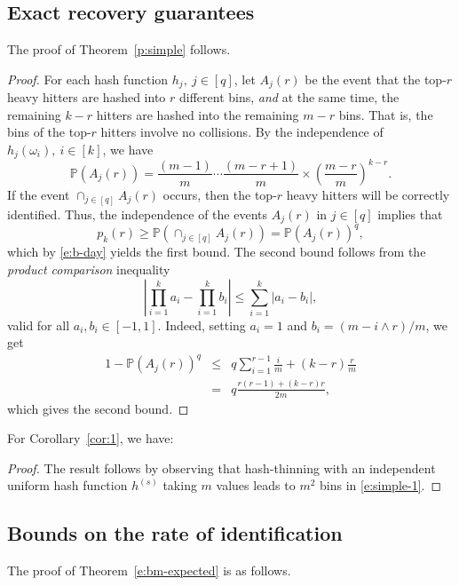 \documentclass[10pt, conference, letterpaper,onecolumn]{IEEEtranv1.8}
\renewcommand\P{\mathbb P}
\theoremstyle{plain}\newtheorem{thm}{Theorem}\newtheorem{lem}{Lemma}
\theoremstyle{definition}
\begin{document}
\subsection{Exact recovery guarantees}


The proof of Theorem~\ref{p:simple} follows.

\begin{proof}
For each hash function $h_j,\ j\in [q]$, let $A_j(r)$ be the event that the top-$r$ heavy hitters are hashed into $r$ different bins,
{\em and} at the same time, the remaining $k-r$ hitters are hashed into the remaining $m-r$ bins. That is, the bins of
the top-$r$ hitters involve no collisions.  By the independence of $h_j(\omega_i),\ i\in [k]$, we have
\begin{equation}\label{e:simple-1}
\P(A_j(r)) = \frac{(m-1)}{m} \cdots \frac{(m-r+1)}{m} \times \left (\frac{m-r}{m}\right)^{k-r}.
\end{equation}
If the event $\cap_{j\in[q]} A_j(r)$ occurs, then the top-$r$ heavy hitters will be correctly identified. Thus, the
independence of the events $A_j(r)$ in $j\in [q]$ implies that 
$$
p_k(r) \ge \P(\cap_{j\in [q]} A_j(r)) = \P(A_j(r))^q, 
$$
which by \eqref{e:b-day} yields the first bound. The second bound follows from 
the {\em product comparison} inequality
$$
|\prod_{i=1}^k a_i - \prod_{i=1}^k b_i |\le \sum_{i=1}^k |a_i - b_i|,
$$
valid for all $a_i,b_i\in[-1,1]$. Indeed, setting $a_i=1$ and $b_i = (m-i\wedge r)/m$, we get
\begin{eqnarray*}
1- \P(A_j(r))^q &\le& q \sum_{i=1}^{r-1}\frac{i}{m} + (k-r)\frac{r}{m} \\
&=& q\frac{ r(r-1) + (k-r)r}{2m},
\end{eqnarray*}
which gives the second bound.
\end{proof}


For Corollary~\ref{cor:1}, we have:

\begin{proof}
The result follows by observing that hash-thinning with an independent uniform 
hash function $h^{(s)}$ taking $m$ values leads to $m^2$ bins in \eqref{e:simple-1}.  
\end{proof}


\subsection{Bounds on the rate of identification}


The proof of Theorem~\ref{e:bm-expected} is as follows.
\end{document}
